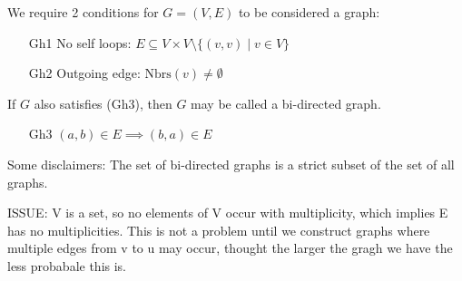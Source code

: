 \documentclass{article}
\theoremstyle{definition}
\begin{document}
We require 2 conditions for $G=(V,E)$ to be considered a graph:
\begin{itemize}
\item[Gh1] No self loops: $E \subseteq V \times V \setminus \{(v,v) \mid v \in V\}$
\item[Gh2] Outgoing edge: $ \text{Nbrs}(v) \neq \emptyset $
\end{itemize}
If $G$ also satisfies (Gh3), then $G$ may be called a bi-directed graph.
\begin{itemize}
\item[Gh3] $(a,b) \in E \implies (b,a) \in E$
\end{itemize}

Some disclaimers:
The set of bi-directed graphs is a strict subset of the set of all graphs. 

ISSUE: V is a set, so no elements of V occur with multiplicity, which implies E has no multiplicities. This is not a problem until we construct graphs where multiple edges from v to u may occur, thought the larger the gragh we have the less probabale this is.
\end{document}

